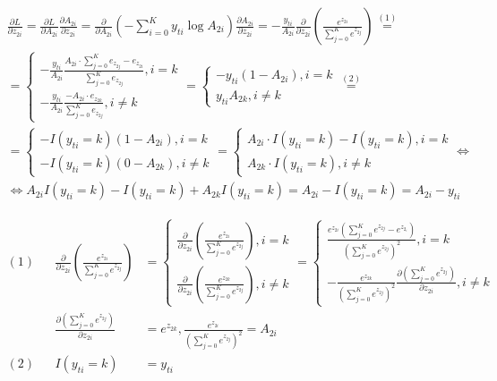\documentclass{article}
\begin{document}
\begin{align*}
\frac{\partial L}{\partial z_{2i}} = \frac{\partial L}{\partial A_{2i}} \frac{\partial A_{2i}}{\partial z_{2i}} = \frac{\partial}{\partial A_{2i}} \left( -\sum_{i=0}^{K} y_{ti} \log A_{2i} \right) \frac{\partial A_{2i}}{\partial z_{2i}} = -\frac{y_{ti}}{A_{2i}} \frac{\partial}{\partial z_{2i}}  \left( \frac{e^{z_{2i}}}{\sum_{j=0}^{K} e^{z_{2j}}} \right) \overset{(1)}{=} \\
= \begin{cases}
-\frac{y_{ti}}{A_{2i}} \frac{A_{2i} \cdot \sum_{j=0}^{K} e_{z_{2j}} - e_{z_{2i}}}{\sum_{j=0}^{K} e_{z_{2j}}} , i = k \\
-\frac{y_{ti}}{A_{2i}} \frac{-A_{2i} \cdot e_{z_{2k}}}{\sum_{j=0}^{K} e_{z_{2j}}} , i \neq k
\end{cases} = \begin{cases}
-y_{ti} (1 - A_{2i}) , i = k \\
y_{ti} A_{2k} , i \neq k
\end{cases} \overset{(2)}{=} \\
= \begin{cases}
-I(y_{ti} = k) (1 - A_{2i}) , i = k \\
-I(y_{ti} = k) (0 - A_{2k}), i \neq k
\end{cases} = \begin{cases}
A_{2i} \cdot I(y_{ti} = k) - I(y_{ti} = k) , i = k \\
A_{2k} \cdot I(y_{ti} = k), i \neq k
\end{cases} \Leftrightarrow \\
\Leftrightarrow A_{2i} I(y_{ti} = k) - I(y_{ti} = k) + A_{2k} I(y_{ti} = k) =  A_{2i} - I(y_{ti} = k) = A_{2i} - y_{ti}
\end{align*}

\begin{align*}
(1) && \frac{\partial}{\partial z_{2i}}  \left( \frac{e^{z_{2i}}}{\sum_{j=0}^{K} e^{z_{2j}}} \right) &= \begin{cases}
\frac{\partial}{\partial z_{2i}}  \left( \frac{e^{z_{2i}}}{\sum_{j=0}^{K} e^{z_{2j}}} \right) , i = k \\
\frac{\partial}{\partial z_{2i}}  \left( \frac{e^{z_{2k}}}{\sum_{j=0}^{K} e^{z_{2j}}} \right) , i \neq k
\end{cases} = \begin{cases}
\frac{e^{z_{2i}} \left( \sum_{j=0}^{K} e^{z_{2j}} - e^{z_{2_i}} \right) }{\left( \sum_{j=0}^{K} e^{z_{2j}} \right)^2} , i = k \\
-\frac{e^{z_{2k}}}{\left( \sum_{j=0}^{K} e^{z_{2j}} \right)^2} \frac{\partial \left( \sum_{j=0}^{K} e^{z_{2j}} \right)}{\partial z_{2i}} , i \neq k
\end{cases} \\
&& \frac{\partial \left( \sum_{j=0}^{K} e^{z_{2j}} \right)}{\partial z_{2i}} &= e^{z_{2k}}, \frac{e^{z_{2i}}}{\left( \sum_{j=0}^{K} e^{z_{2j}} \right)^2} = A_{2i} \\
(2) && I(y_{ti} = k) &= y_{ti} 
\end{align*}
\end{document}
